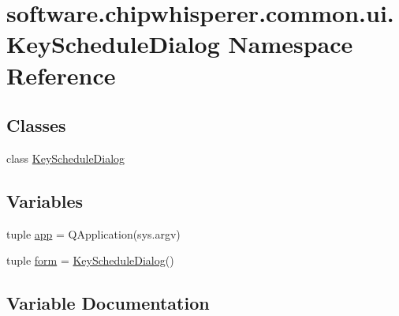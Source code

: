 \hypertarget{namespacesoftware_1_1chipwhisperer_1_1common_1_1ui_1_1KeyScheduleDialog}{}\section{software.\+chipwhisperer.\+common.\+ui.\+Key\+Schedule\+Dialog Namespace Reference}
\label{namespacesoftware_1_1chipwhisperer_1_1common_1_1ui_1_1KeyScheduleDialog}
\subsection*{Classes}
\begin{DoxyCompactItemize}
\item 
class \hyperlink{classsoftware_1_1chipwhisperer_1_1common_1_1ui_1_1KeyScheduleDialog_1_1KeyScheduleDialog}{Key\+Schedule\+Dialog}
\end{DoxyCompactItemize}
\subsection*{Variables}
\begin{DoxyCompactItemize}
\item 
tuple \hyperlink{namespacesoftware_1_1chipwhisperer_1_1common_1_1ui_1_1KeyScheduleDialog_a50bdeb1d34b3c23e5bbfe4ac41cc2c7e}{app} = Q\+Application(sys.\+argv)
\item 
tuple \hyperlink{namespacesoftware_1_1chipwhisperer_1_1common_1_1ui_1_1KeyScheduleDialog_a411eade7ad38e933fe6ee049c33ac274}{form} = \hyperlink{classsoftware_1_1chipwhisperer_1_1common_1_1ui_1_1KeyScheduleDialog_1_1KeyScheduleDialog}{Key\+Schedule\+Dialog}()
\end{DoxyCompactItemize}


\subsection{Variable Documentation}
\hypertarget{namespacesoftware_1_1chipwhisperer_1_1common_1_1ui_1_1KeyScheduleDialog_a50bdeb1d34b3c23e5bbfe4ac41cc2c7e}{}
